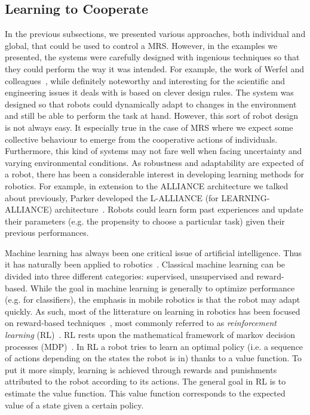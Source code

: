   \subsection{Learning to Cooperate}
  \label{subsection:RL}

    In the previous subsections, we presented various approaches, both individual and global, that could be used to control a MRS. However, in the examples we presented, the systems were carefully designed with ingenious techniques so that they could perform the way it was intended. For example, the work of Werfel and colleagues~\parencite{Werfel2014}, while definitely noteworthy and interesting for the scientific and engineering issues it deals with is based on clever design rules. The system was designed so that robots could dynamically adapt to changes in the environment and still be able to perform the task at hand. However, this sort of robot design is not always easy. It especially true in the case of MRS where we expect some collective behaviour to emerge from the cooperative actions of individuals. Furthermore, this kind of systems may not fare well when facing uncertainty and varying environmental conditions. As robustness and adaptability are expected of a robot, there has been a considerable interest in developing learning methods for robotics. For example, in extension to the ALLIANCE architecture we talked about previously, Parker developed the L-ALLIANCE (for LEARNING-ALLIANCE) architecture~\parencite{Parker1994}. Robots could learn form past experiences and update their parameters (e.g. the propensity to choose a particular task) given their previous performances.

    Machine learning has always been one critical issue of artificial intelligence. Thus it has naturally been applied to robotics~\parencite{Hertzberg2008}. Classical machine learning can be divided into three different categories: supervised, unsupervised and reward-based. While the goal in machine learning is generally to optimize performance (e.g. for classifiers), the emphasis in mobile robotics is that the robot may adapt quickly. As such, most of the litterature on learning in robotics has been focused on reward-based techniques~\parencite{Mataric2008}, most commonly referred to as \emph{reinforcement learning} (RL)~\parencite{Sutton1998}. RL rests upon the mathematical framework of markov decision processes (MDP)~\parencite{Bellman1957}. In RL a robot tries to learn an optimal policy (i.e. a sequence of actions depending on the states the robot is in) thanks to a value function. To put it more simply, learning is achieved through rewards and punishments attributed to the robot according to its actions. The general goal in RL is to estimate the value function. This value function corresponds to the expected value of a state given a certain policy.

